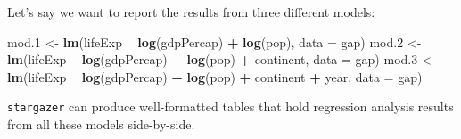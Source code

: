 \documentclass[]{book}
\newenvironment{Shaded}{\begin{snugshade}}{\end{snugshade}}
\newcommand{\KeywordTok}[1]{\textcolor[rgb]{0.13,0.29,0.53}{\textbf{#1}}}
\newcommand{\DataTypeTok}[1]{\textcolor[rgb]{0.13,0.29,0.53}{#1}}
\newcommand{\DecValTok}[1]{\textcolor[rgb]{0.00,0.00,0.81}{#1}}
\newcommand{\StringTok}[1]{\textcolor[rgb]{0.31,0.60,0.02}{#1}}
\newcommand{\OperatorTok}[1]{\textcolor[rgb]{0.81,0.36,0.00}{\textbf{#1}}}
\newcommand{\NormalTok}[1]{#1}
\begin{document}
Let's say we want to report the results from three different models:

\begin{Shaded}
\begin{Highlighting}[]
\NormalTok{mod.}\DecValTok{1}\NormalTok{ <-}\StringTok{ }\KeywordTok{lm}\NormalTok{(lifeExp }\OperatorTok{~}\StringTok{ }\KeywordTok{log}\NormalTok{(gdpPercap) }\OperatorTok{+}\StringTok{ }\KeywordTok{log}\NormalTok{(pop), }\DataTypeTok{data =}\NormalTok{ gap)}
\NormalTok{mod.}\DecValTok{2}\NormalTok{ <-}\StringTok{ }\KeywordTok{lm}\NormalTok{(lifeExp }\OperatorTok{~}\StringTok{ }\KeywordTok{log}\NormalTok{(gdpPercap) }\OperatorTok{+}\StringTok{ }\KeywordTok{log}\NormalTok{(pop) }\OperatorTok{+}\StringTok{ }\NormalTok{continent, }\DataTypeTok{data =}\NormalTok{ gap)}
\NormalTok{mod.}\DecValTok{3}\NormalTok{ <-}\StringTok{ }\KeywordTok{lm}\NormalTok{(lifeExp }\OperatorTok{~}\StringTok{ }\KeywordTok{log}\NormalTok{(gdpPercap) }\OperatorTok{+}\StringTok{ }\KeywordTok{log}\NormalTok{(pop) }\OperatorTok{+}\StringTok{ }\NormalTok{continent }\OperatorTok{+}\StringTok{ }\NormalTok{year, }\DataTypeTok{data =}\NormalTok{ gap)}
\end{Highlighting}
\end{Shaded}

\texttt{stargazer} can produce well-formatted tables that hold
regression analysis results from all these models side-by-side.
\end{document}
